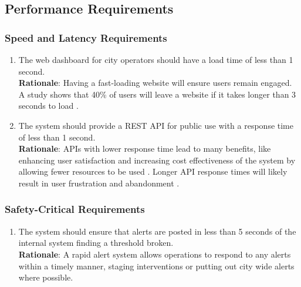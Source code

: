 \documentclass[]{article}
\begin{document}


\subsection{Performance Requirements}
\label{sub:performance_requirements}

\subsubsection{Speed and Latency Requirements}
\label{ssub:speed_and_latency_requirements}
\begin{enumerate}[{PR-SL}1.]
	\item The web dashboard for city operators should have a load time of less than 1 second. \\
    \textbf{Rationale}: Having a fast-loading website will ensure users remain engaged. A study shows that 40\% of users will leave a website if it takes longer than 3 seconds to load \cite{browserstack}.
    
    \item The system should provide a REST API for public use with a response time of less than 1 second. \\
    \textbf{Rationale}: APIs with lower response time lead to many benefits, like enhancing user satisfaction and increasing cost effectiveness of the system by allowing fewer resources to be used  \cite{farouk2024}. Longer API response times will likely result in user frustration and abandonment \cite{farouk2024}.
\end{enumerate}

\subsubsection{Safety-Critical Requirements}
\label{ssub:safety_critical_requirements}
\begin{enumerate}[{PR-SC}1. ]
	\item The system should ensure that alerts are posted in less than 5 seconds of the internal system finding a threshold broken.\\
    \textbf{Rationale}: A rapid alert system allows operations to respond to any alerts within a timely manner, staging interventions or putting out city wide alerts where possible. 
\end{enumerate}
\end{document}
